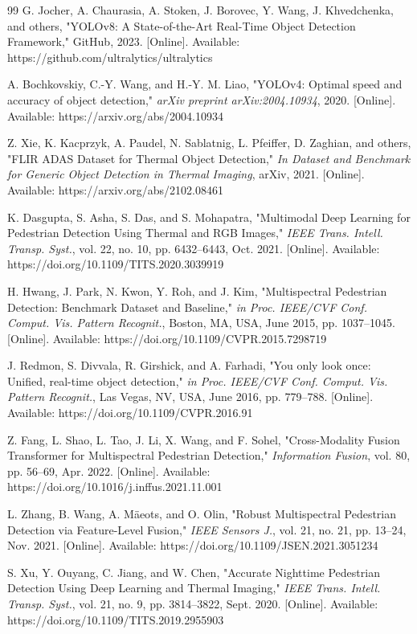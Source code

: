 \documentclass[conference]{IEEEtran}
\begin{document}
\begin{thebibliography}{99}
G. Jocher, A. Chaurasia, A. Stoken, J. Borovec, Y. Wang, J. Khvedchenka, and others,
"YOLOv8: A State-of-the-Art Real-Time Object Detection Framework,"
GitHub, 2023. [Online]. Available: https://github.com/ultralytics/ultralytics

A. Bochkovskiy, C.-Y. Wang, and H.-Y. M. Liao,
"YOLOv4: Optimal speed and accuracy of object detection,"
\textit{arXiv preprint arXiv:2004.10934}, 2020.
[Online]. Available: https://arxiv.org/abs/2004.10934

Z. Xie, K. Kacprzyk, A. Paudel, N. Sablatnig, L. Pfeiffer, D. Zaghian, and others,
"FLIR ADAS Dataset for Thermal Object Detection,"
\textit{In Dataset and Benchmark for Generic Object Detection in Thermal Imaging}, arXiv, 2021.
[Online]. Available: https://arxiv.org/abs/2102.08461

K. Dasgupta, S. Asha, S. Das, and S. Mohapatra,
"Multimodal Deep Learning for Pedestrian Detection Using Thermal and RGB Images,"
\textit{IEEE Trans. Intell. Transp. Syst.}, vol. 22, no. 10, pp. 6432--6443, Oct. 2021.
[Online]. Available: https://doi.org/10.1109/TITS.2020.3039919

H. Hwang, J. Park, N. Kwon, Y. Roh, and J. Kim,
"Multispectral Pedestrian Detection: Benchmark Dataset and Baseline,"
\textit{in Proc. IEEE/CVF Conf. Comput. Vis. Pattern Recognit.}, Boston, MA, USA, June 2015, pp. 1037--1045.
[Online]. Available: https://doi.org/10.1109/CVPR.2015.7298719

J. Redmon, S. Divvala, R. Girshick, and A. Farhadi,
"You only look once: Unified, real-time object detection,"
\textit{in Proc. IEEE/CVF Conf. Comput. Vis. Pattern Recognit.}, Las Vegas, NV, USA, June 2016, pp. 779--788.
[Online]. Available: https://doi.org/10.1109/CVPR.2016.91

Z. Fang, L. Shao, L. Tao, J. Li, X. Wang, and F. Sohel,
"Cross-Modality Fusion Transformer for Multispectral Pedestrian Detection,"
\textit{Information Fusion}, vol. 80, pp. 56--69, Apr. 2022.
[Online]. Available: https://doi.org/10.1016/j.inffus.2021.11.001

L. Zhang, B. Wang, A. Mäeots, and O. Olin,
"Robust Multispectral Pedestrian Detection via Feature-Level Fusion,"
\textit{IEEE Sensors J.}, vol. 21, no. 21, pp. 13--24, Nov. 2021.
[Online]. Available: https://doi.org/10.1109/JSEN.2021.3051234

S. Xu, Y. Ouyang, C. Jiang, and W. Chen,
"Accurate Nighttime Pedestrian Detection Using Deep Learning and Thermal Imaging,"
\textit{IEEE Trans. Intell. Transp. Syst.}, vol. 21, no. 9, pp. 3814--3822, Sept. 2020.
[Online]. Available: https://doi.org/10.1109/TITS.2019.2955903


\end{thebibliography}
\end{document}

